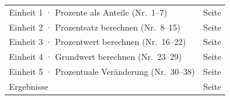 \documentclass[11pt]{article}
\begin{document}
\weit
{}
\begin{tabular}{@{}p{12.5cm}r@{}}
Einheit 1 · Prozente als Anteile (Nr.\ 1--7) & Seite \pageref{e1}\\
Einheit 2 · Prozentsatz berechnen (Nr.\ 8--15) & Seite \pageref{e2}\\
Einheit 3 · Prozentwert berechnen (Nr.\ 16--22) & Seite \pageref{e3}\\
Einheit 4 · Grundwert berechnen (Nr.\ 23--29) & Seite \pageref{e4}\\
Einheit 5 · Prozentuale Veränderung (Nr.\ 30--38) & Seite \pageref{e5}\\
Ergebnisse & Seite \pageref{erg}\\
\end{tabular}

\begleitteil\label{erg}

\end{document}

